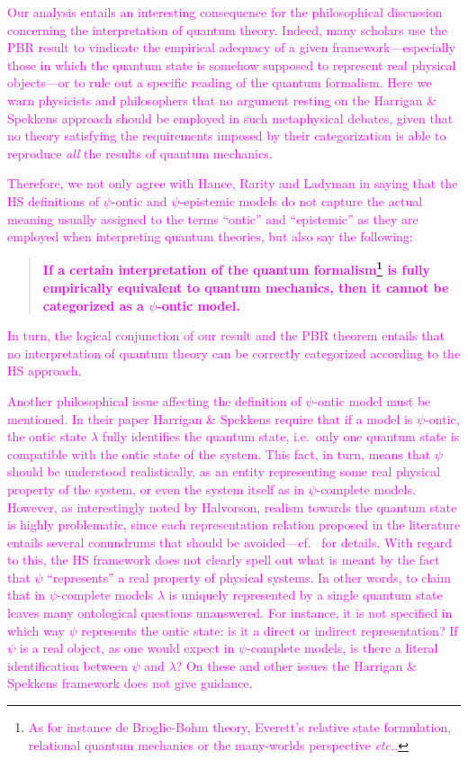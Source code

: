 \documentclass[10pt,twocolumn, nofootinbib]{revtex4-2}
\begin{document}
\textcolor{magenta}{Our analysis entails an interesting consequence for the philosophical discussion concerning the interpretation of quantum theory. Indeed, many scholars use the PBR result to vindicate the empirical adequacy of a given framework---especially those in which the quantum state is somehow supposed to represent real physical objects---or to rule out a specific reading of the quantum formalism. Here we warn physicists and philosophers that no argument resting on the Harrigan \& Spekkens approach should be employed in such metaphysical debates, given that no theory satisfying the requirements imposed by their categorization is able to reproduce \emph{all} the results of quantum mechanics.}

\textcolor{magenta}{Therefore, we not only agree with Hance, Rarity and Ladyman in saying that the HS definitions of $\psi$-ontic and $\psi$-epistemic models do not capture the actual meaning usually assigned to the terms ``ontic'' and ``epistemic'' as they are employed when interpreting quantum theories, but also say the following:}
\begin{quote}
	\textcolor{magenta}{\textbf{If a certain interpretation of the quantum formalism\footnote{\textcolor{magenta}{As for instance de Broglie-Bohm theory, Everett's relative state formulation, relational quantum mechanics or the many-worlds perspective \emph{etc.}.}} is fully empirically equivalent to quantum mechanics, then it cannot be categorized as a $\psi$-ontic model.}}
\end{quote}
\noindent \textcolor{magenta}{In turn, the logical conjunction of our result and the PBR theorem entails that no interpretation of quantum theory can be correctly categorized according to the HS approach.}

\textcolor{magenta}{Another philosophical issue affecting the definition of $\psi$-ontic model must be mentioned. In their paper Harrigan \& Spekkens require that if a model is $\psi$-ontic, the ontic state $\lambda$ fully identifies the quantum state, i.e.\ only one quantum state is compatible with the ontic state of the system. This fact, in turn, means that $\psi$ should be understood realistically, as an entity representing some real physical property of the system, or even the system itself as in $\psi$-complete models. However, as interestingly noted by Halvorson, realism towards the quantum state is highly problematic, since each representation relation proposed in the literature entails several conundrums that should be avoided---cf.\  \cite{Halvorson:2019} for details. With regard to this, the HS framework does not clearly spell out what is meant by the fact that $\psi$ ``represents'' a real property of physical systems. In other words, to claim that in $\psi$-complete models $\lambda$ is uniquely represented by a single quantum state leaves many ontological questions unanswered. For instance, it is not specified in which way $\psi$ represents the ontic state: is it a direct or indirect representation? If $\psi$ is a real object, as one would expect in $\psi$-complete models, is there a literal identification between $\psi$ and $\lambda$? On these and other issues the Harrigan \& Spekkens framework does not give guidance.} 
\end{document}
